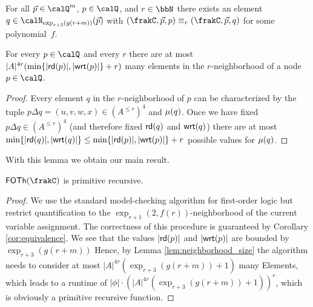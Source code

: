 \begin{corollary}\label{cor:equivalence}
	For all $\vec{p}\in \Qx^m$, $p\in \Qx$, and $r\in\bbN$ there exists an element $q\in \calN_{\exp_{r+3}(g(r+m))}(\vec{p})$ with $(\frakC, \vec{p}, p) \equiv_r (\frakC,\vec{p}, q)$ for some polynomial~$f$.
\end{corollary}
\begin{lemma}\label{lem:neighborhood_size}
	For every $p\in \Qx$ and every $r$ there are at most $|A|^{4r} (\min\{|\mathsf{rd}(p)|, |\mathsf{wrt}(p)|\} + r)$ many elements in the $r$-neighborhood of a node $p\in \Qx$. 
\end{lemma}
\begin{proof}
	Every element $q$ in the $r$-neighborhood of $p$ can be characterized by the tuple $p\Delta q = (u,v, w, x)\in (A^{\leq r})^4$ and $\mu(q)$. Once we have fixed  
	$p\Delta q \in (A^{\leq r})^4$ (and therefore fixed $\mathsf{rd}(q)$ and $\mathsf{wrt}(q)$) there are at most $\min\{ |\mathsf{rd}(q)|, |\mathsf{wrt}(q)| \} \leq \min\{ |\mathsf{rd}(p)|, |\mathsf{wrt}(p)| \} + r$ possible values for $\mu(q)$.
\end{proof}

With this lemma we obtain our main result.

\begin{theorem}
	$\FOTh{\frakC}$ is primitive recursive.
\end{theorem}
\begin{proof}
	We use the standard model-checking algorithm for first-order logic but restrict quantification to the $\exp_{r+1}(2,f(r))$-neighborhood of the current variable assignment. The correctness of this procedure is guaranteed by Corollary \ref{cor:equivalence}.
	We see that the values $|\mathsf{rd}(p)|$ and $|\mathsf{wrt}(p)|$ are bounded by $\exp_{r+3}(g(r+m))$
	Hence, by Lemma \ref{lem:neighborhood_size} the algorithm needs to consider at most $|A|^{4r} (\exp_{r+3}(g(r+m)) +1)$ many Elements, which leads to a runtime of
	$|\phi| \cdot (|A|^{4r} (\exp_{r+3}(g(r+m)) +1))^r$, which is obviously a primitive recursive function. 
\end{proof}